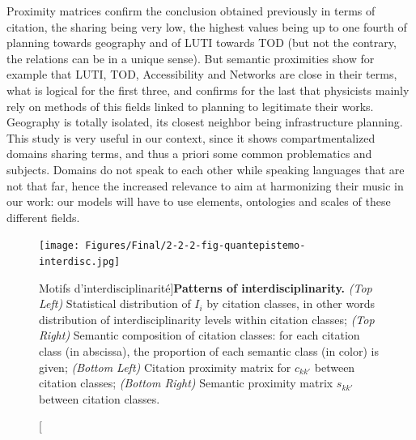 \documentclass[galley]{jtlu-article-2col}
\begin{document}
Proximity matrices confirm the conclusion obtained previously in terms of citation, the sharing being very low, the highest values being up to one fourth of planning towards geography and of LUTI towards TOD (but not the contrary, the relations can be in a unique sense). But semantic proximities show for example that LUTI, TOD, Accessibility and Networks are close in their terms, what is logical for the first three, and confirms for the last that physicists mainly rely on methods of this fields linked to planning to legitimate their works. Geography is totally isolated, its closest neighbor being infrastructure planning. This study is very useful in our context, since it shows compartmentalized domains sharing terms, and thus a priori some common problematics and subjects. Domains do not speak to each other while speaking languages that are not that far, hence the increased relevance to aim at harmonizing their music in our work: our models will have to use elements, ontologies and scales of these different fields.


\begin{figure}
\texttt{[image: Figures/Final/2-2-2-fig-quantepistemo-interdisc.jpg]}
\caption[Patterns of interdisciplinarity][Motifs d'interdisciplinarité]{\textbf{Patterns of interdisciplinarity.} \textit{(Top Left)} Statistical distribution of $I_i$ by citation classes, in other words distribution of interdisciplinarity levels within citation classes; \textit{(Top Right)} Semantic composition of citation classes: for each citation class (in abscissa), the proportion of each semantic class (in color) is given; \textit{(Bottom Left)} Citation proximity matrix for $c_{kk'}$ between citation classes; \textit{(Bottom Right)} Semantic proximity matrix $s_{kk'}$ between citation classes. \label{fig:quantepistemo:interdisc}}
\end{figure}
\end{document}

